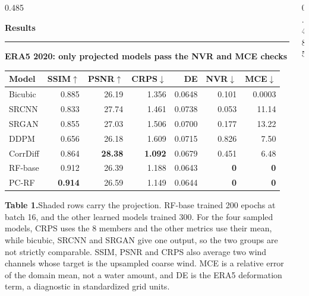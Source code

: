 \documentclass{beamer}
\newenvironment{possection}[2]{%
  \par\vspace{0.10cm}%
  \noindent{\color{pcbluedark}\bfseries\large #1}\hspace{0.42em}%
  {\color{ncink}\bfseries\large #2}\par\vspace{-0.20cm}%
  \noindent\textcolor{ncline}{\rule{\linewidth}{0.9pt}}\par\vspace{0cm}%
  \begin{minipage}{\linewidth}%
}{%
  \end{minipage}\par\vspace{0.40cm}%
}
\newcommand{\possub}[2]{%
  \par\vspace{0.02cm}%
  \noindent{\color{pcbluedark}\bfseries #1}\hspace{0.38em}%
  {\color{ncink}\bfseries #2}\par\vspace{0.07cm}%
}
\newcommand{\figcap}[2]{%
  \par\vspace{0.18cm}%
  \raggedright{\color{ncmuted}\normalsize\textbf{#1}\hspace{0.3em}#2\par}%
}
\begin{document}
\begin{frame}[t]
\begin{columns}[t,onlytextwidth]
\begin{column}{0.485\textwidth}
\begin{possection}{4.}{Results}
    \possub{4.2}{ERA5 2020: only projected models pass the NVR and MCE checks}
    {\small
    \setlength{\tabcolsep}{9pt}
    \renewcommand{\arraystretch}{1.12}
    \begin{tabularx}{\linewidth}{@{}>{\raggedright\arraybackslash}X rrrrrr@{}}
      \toprule
      \textbf{Model} & \textbf{SSIM}$\uparrow$ & \textbf{PSNR}$\uparrow$ &
      \textbf{CRPS}$\downarrow$ & \textbf{DE} & \textbf{NVR}$\downarrow$ &
      \textbf{MCE}$\downarrow$\\
      \midrule
      Bicubic  & 0.885 & 26.19 & 1.356 & 0.0648 & 0.101 & 0.0003\\
      SRCNN    & 0.833 & 27.74 & 1.461 & 0.0738 & 0.053 & 11.14\\
      SRGAN    & 0.855 & 27.03 & 1.506 & 0.0700 & 0.177 & 13.22\\
      DDPM     & 0.656 & 26.18 & 1.609 & 0.0715 & 0.826 & 7.50\\
      CorrDiff & 0.864 & \textbf{28.38} & \textbf{1.092} & 0.0679 & 0.451 & 6.48\\
      \rowcolor{pcwash}RF-base & 0.912 & 26.39 & 1.188 & 0.0643 & \textbf{0} & \textbf{0}\\
      \rowcolor{pcwash}PC-RF   & \textbf{0.914} & 26.59 & 1.149 & 0.0644 & \textbf{0} & \textbf{0}\\
      \bottomrule
    \end{tabularx}}
    \figcap{Table 1.}{Shaded rows carry the projection. RF-base trained 200 epochs at
    batch 16, and the other learned models trained 300. For the four sampled models,
    CRPS uses the 8 members and the other metrics use their mean, while bicubic, SRCNN
    and SRGAN give one output, so the two groups are not strictly comparable. SSIM, PSNR
    and CRPS also average two wind channels whose target is the upsampled coarse wind.
    MCE is a relative error of the domain mean, not a water amount, and DE is the ERA5
    deformation term, a diagnostic in standardized grid units.}
    \par\vspace{0.30cm}

  \end{possection}

  \vspace{-0.40cm}
\end{column}

\begin{column}{0.485\textwidth}


\end{column}
\end{columns}
\end{frame}
\end{document}
